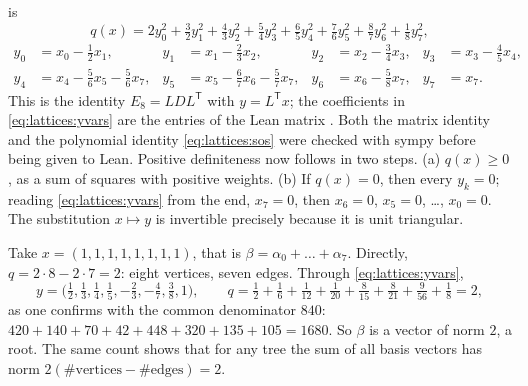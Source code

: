 is
\begin{equation}\label{eq:lattices:sos}
 q(x)=2y_0^2+\tfrac32y_1^2+\tfrac43y_2^2+\tfrac54y_3^2+\tfrac65y_4^2+\tfrac76y_5^2
 +\tfrac87y_6^2+\tfrac18y_7^2 ,
\end{equation}
\begin{equation}\label{eq:lattices:yvars}
\begin{aligned}
 y_0&=x_0-\tfrac12x_1, & y_1&=x_1-\tfrac23x_2, & y_2&=x_2-\tfrac34x_3, &
 y_3&=x_3-\tfrac45x_4,\\
 y_4&=x_4-\tfrac56x_5-\tfrac56x_7, & y_5&=x_5-\tfrac67x_6-\tfrac57x_7, &
 y_6&=x_6-\tfrac58x_7, & y_7&=x_7 .
\end{aligned}
\end{equation}
This is the identity $E_8=LDL^{\mathsf T}$ with $y=L^{\mathsf T}x$; the coefficients in
\eqref{eq:lattices:yvars} are the entries of the Lean matrix . Both the matrix
identity and the polynomial identity \eqref{eq:lattices:sos} were checked with sympy before
being given to Lean. Positive definiteness now follows in two steps. (a) $q(x)\ge0$, as a sum
of squares with positive weights. (b) If $q(x)=0$, then every $y_k=0$; reading
\eqref{eq:lattices:yvars} from the end, $x_7=0$, then $x_6=0$, $x_5=0$, \dots, $x_0=0$. The
substitution $x\mapsto y$ is invertible precisely because it is unit triangular.

\begin{example}\label{ex:lattices:allones}
Take $x=(1,1,1,1,1,1,1,1)$, that is $\beta=\alpha_0+\dots+\alpha_7$. Directly,
$q=2\cdot8-2\cdot7=2$: eight vertices, seven edges. Through \eqref{eq:lattices:yvars},
\[
 y=\bigl(\tfrac12,\tfrac13,\tfrac14,\tfrac15,-\tfrac23,-\tfrac47,\tfrac38,1\bigr),\qquad
 q=\tfrac12+\tfrac16+\tfrac1{12}+\tfrac1{20}+\tfrac8{15}+\tfrac8{21}+\tfrac9{56}+\tfrac18=2 ,
\]
as one confirms with the common denominator $840$:
$420+140+70+42+448+320+135+105=1680$. So $\beta$ is a vector of norm $2$, a root. The same
count shows that for any tree the sum of all basis vectors has norm
$2(\#\text{vertices}-\#\text{edges})=2$.
\end{example}

